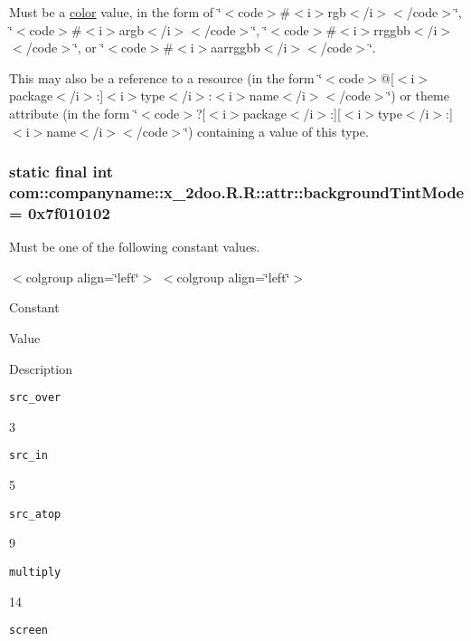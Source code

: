 Must be a \hyperlink{classcom_1_1companyname_1_1x__2doo_1_1_r_1_1color}{color} value, in the form of \char`\"{}$<$code$>$\#$<$i$>$rgb$<$/i$>$$<$/code$>$\char`\"{}, \char`\"{}$<$code$>$\#$<$i$>$argb$<$/i$>$$<$/code$>$\char`\"{}, \char`\"{}$<$code$>$\#$<$i$>$rrggbb$<$/i$>$$<$/code$>$\char`\"{}, or \char`\"{}$<$code$>$\#$<$i$>$aarrggbb$<$/i$>$$<$/code$>$\char`\"{}. 

This may also be a reference to a resource (in the form \char`\"{}$<$code$>$@\mbox{[}$<$i$>$package$<$/i$>$:\mbox{]}$<$i$>$type$<$/i$>$:$<$i$>$name$<$/i$>$$<$/code$>$\char`\"{}) or theme attribute (in the form \char`\"{}$<$code$>$?\mbox{[}$<$i$>$package$<$/i$>$:\mbox{]}\mbox{[}$<$i$>$type$<$/i$>$:\mbox{]}$<$i$>$name$<$/i$>$$<$/code$>$\char`\"{}) containing a value of this type. \hypertarget{classcom_1_1companyname_1_1x__2doo_1_1_r_1_1attr_506bd205bde05e75b64eae0de40e1b7b}{
\subsubsection[{backgroundTintMode}]{\setlength{\rightskip}{0pt plus 5cm}static final int com::companyname::x\_\-2doo.R.R::attr::backgroundTintMode = 0x7f010102}}
\label{classcom_1_1companyname_1_1x__2doo_1_1_r_1_1attr_506bd205bde05e75b64eae0de40e1b7b}


Must be one of the following constant values. \begin{TabularC}{0}
\hline
\end{TabularC}
$<$colgroup align=\char`\"{}left\char`\"{}$>$ $<$colgroup align=\char`\"{}left\char`\"{}$>$ 

Constant

Value

Description 

{\tt src\_\-over}

3

{\tt src\_\-in}

5

{\tt src\_\-atop}

9

{\tt multiply}

14

{\tt screen}

